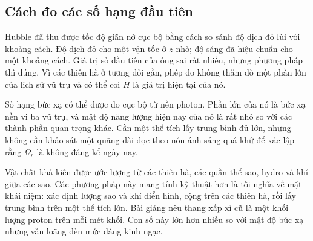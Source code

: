 \subsection{Cách đo các số hạng đầu tiên}

Hubble đã thu được tốc độ giãn nở cục bộ bằng cách so sánh độ dịch đỏ lùi với khoảng cách. Độ dịch đỏ cho một vận tốc ở \(z\) nhỏ; độ sáng đã hiệu chuẩn cho một khoảng cách. Giá trị số đầu tiên của ông sai rất nhiều, nhưng phương pháp thì đúng. Vì các thiên hà ở tương đối gần, phép đo không thăm dò một phần lớn của lịch sử vũ trụ và có thể coi \(H\) là giá trị hiện tại của nó.

\begin{classroomqa}
\end{classroomqa}

\begin{classroomqa}
\end{classroomqa}

Số hạng bức xạ có thể được đo cục bộ từ nền photon. Phần lớn của nó là bức xạ nền vi ba vũ trụ, và mật độ năng lượng hiện nay của nó là rất nhỏ so với các thành phần quan trọng khác. Cần một thể tích lấy trung bình đủ lớn, nhưng không cần khảo sát một quãng dài dọc theo nón ánh sáng quá khứ để xác lập rằng \(\Omega_r\) là không đáng kể ngày nay.

Vật chất khả kiến được ước lượng từ các thiên hà, các quần thể sao, hydro và khí giữa các sao. Các phương pháp này mang tính kỹ thuật hơn là tối nghĩa về mặt khái niệm: xác định lượng sao và khí điển hình, cộng trên các thiên hà, rồi lấy trung bình trên một thể tích lớn. Bài giảng nêu thang xấp xỉ cũ là một khối lượng proton trên mỗi mét khối. Con số này lớn hơn nhiều so với mật độ bức xạ nhưng vẫn loãng đến mức đáng kinh ngạc.

